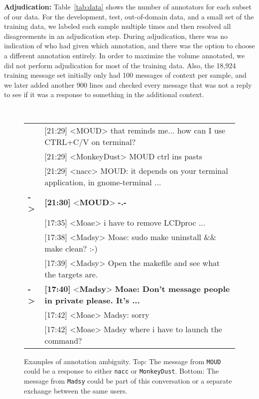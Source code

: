 \documentclass[11pt,a4paper]{article}
\newcommand{\tightparagraph}[1]{\noindent\textbf{#1:}}
\begin{document}
\tightparagraph{Adjudication}
Table~\ref{tab:data} shows the number of annotators for each subset of our data.
For the development, test, out-of-domain data, and a small set of the training data, we labeled each sample multiple times and then resolved all disagreements in an adjudication step.
During adjudication, there was no indication of who had given which annotation, and there was the option to choose a different annotation entirely.
In order to maximize the volume annotated, we did not perform adjudication for most of the training data.
Also, the 18,924 training message set initially only had 100 messages of context per sample, and we later added another 900 lines and checked every message that was not a reply to see if it was a response to something in the additional context.

\begin{figure}
\centering
  \scriptsize
  \tt
  \frenchspacing
  \setlength{\tabcolsep}{3pt}

  \begin{tabular}{l p{7cm}}
       & [21:29] <MOUD> that reminds me... how can I use CTRL+C/V on terminal? \\[1pt]
       & [21:29] <MonkeyDust> MOUD ctrl ins pasts \\[1pt]
       & [21:29] <nacc> MOUD: it depends on your terminal application, in gnome-terminal ... \\[1pt]
    \textbf{->} & \textcolor{OliveGreen}{\textbf{[21:30]} <\textbf{MOUD}> \textbf{-.-}} \\[11pt]

       & [17:35] <Moae> i have to remove LCDproc ... \\[1pt]
       & [17:38] <Madsy> Moae: sudo make uninstall \&\& make clean? :-) \\[1pt]
       & [17:39] <Madsy> Open the makefile and see what the targets are. \\[1pt]
    \textbf{->} & \textcolor{OliveGreen}{\textbf{[17:40]} <\textbf{Madsy}> \textbf{Moae: Don't message people in private please. It's ...}} \\[1pt]
       & [17:42] <Moae> Madsy: sorry \\[1pt]
       & [17:42] <Moae> Madsy where i have to launch the command? \\[1pt]
  \end{tabular}

  \caption{\label{fig:ambiguity}
  Examples of annotation ambiguity.
  Top: The message from \texttt{MOUD} could be a response to either \texttt{nacc} or \texttt{MonkeyDust}.
  Bottom: The message from \texttt{Madsy} could be part of this conversation or a separate exchange between the same users.
  }
\end{figure}
 
\end{document}

